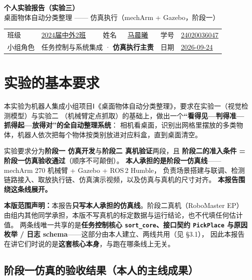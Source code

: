 \documentclass[12pt,a4paper]{ctexart}
\begin{document}
\begin{center}
  {\LARGE\bfseries 个人实验报告（实验三）}\\[6pt]
  {\Large 桌面物体自动分类整理 —— 仿真执行（mechArm + Gazebo，阶段一）}
\end{center}

\begin{center}
\renewcommand{\arraystretch}{1.35}
\begin{tabular}{@{}l p{3.5cm} l p{3.5cm} l p{3.5cm}@{}}
  班级 & \underline{2024届中外2班} & 姓名 & \underline{马晨曦} & 学号 & \underline{24020036047} \\
  小组角色 & \multicolumn{3}{l}{任务控制与系统集成 · \textbf{仿真执行主责}} & 日期 & \underline{2026-09-24} \\
\end{tabular}
\end{center}

\section{实验的基本要求}

本实验为机器人集成小组项目Ⅰ《桌面物体自动分类整理》，要求在实验一（视觉检测模型）与实验二
（机械臂定点抓取）的基础上，做出一个\textbf{“看得见—判得准—抓得起—放得对”的全自动整理系统}：
相机看桌面，识别出网格里摆放的多类物体，机器人依次把每个物体按类别放进对应料盒，直到桌面清空。

实验要求分为\textbf{阶段一 仿真开发}与\textbf{阶段二 真机验证}两段，且
\textbf{阶段二的准入条件 = 阶段一仿真验收通过}（顺序不可颠倒）。
\textbf{本人承担的是阶段一仿真线}——mechArm 270 机械臂 + Gazebo + ROS\,2 Humble，
负责场景搭建与联调、检测链路接入、取放执行链、仿真演示视频，以及仿真与真机的尺寸对齐。
\textbf{本报告围绕这条线展开。}

\textbf{本版范围声明：}本报告\textbf{只写本人承担的仿真线}。阶段二真机（RoboMaster EP）
由组内其他同学承担，本版不写真机的标定数据与运行结论，也不代填任何估计值。
两条线唯一共享的是\textbf{任务控制核心 \texttt{sort\_core}、接口契约 \texttt{PickPlace}
与原因枚举 / 日志 schema}——这部分由本人建立、两线共用（见 §3.1），
因此本报告在讲它们时说的是\textbf{这套核心本身}，与跑在哪条线上无关。

\subsection*{阶段一仿真的验收结果（本人的主线成果）}
\end{document}
